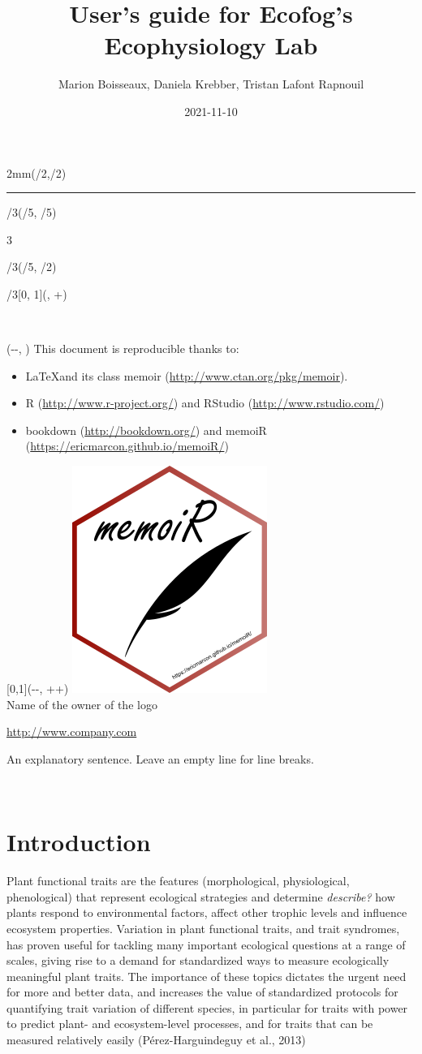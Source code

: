 \documentclass[
  12pt,
  american,
  a4paper,
  extrafontsizes,onecolumn,openright
  ]{memoir}
\title{User's guide for Ecofog's Ecophysiology Lab}
\author{Marion Boisseaux, Daniela Krebber, Tristan Lafont Rapnouil}
\date{2021-11-10}
\makeatletter
\newcommand{\MemoirChapStyle}{daleif1}
\newcommand{\MemoirPageStyle}{Ruled}
\newlength\widthw %
\newcommand*{\SmallMargins}{
  \setlrmarginsandblock{1.5in}{1.5in}{*}
  \setmarginnotes{0.1in}{0.1in}{0.1in}
 \setulmarginsandblock{1.5in}{1in}{*}
  \checkandfixthelayout
  \ch@ngetext
  \clearpage
  \setlength{\widthw}{\textwidth+\marginparsep+\marginparwidth}
  \footnotesatfoot
  \chapterstyle{\MemoirChapStyle}  %
  \pagestyle{\MemoirPageStyle}
}
\newcommand{\LargeMargins}{\SmallMargins}
\newcommand{\MainTitlePage}[2]{
  \SmallMargins %
  \pagestyle{empty} %
  \textblockorigin{\stockwidth-\paperwidth-\trimedge}{\trimtop} %
  \begin{textblock*}{2mm}(\spinemargin/2,\uppermargin/2)
    \rule{1pt}{\paperheight-\uppermargin}
  \end{textblock*}
  \begin{textblock*}{\paperwidth*2/3}(\paperwidth/5, \paperheight/5)
    \flushright
    \begin{Spacing}{3}
      {\fontfamily{qtm}\selectfont\fontsize{45}{45}\selectfont\textsc{\thetitle}}
    \end{Spacing}
  \end{textblock*}
    \begin{textblock*}{\paperwidth*2/3}(\paperwidth/5, \paperheight/2)
    \flushright
    {\fontfamily{qtm}\huge\theauthor}
  \end{textblock*}
    \begin{textblock*}{\paperwidth*2/3}[0, 1](\spinemargin, \uppermargin+\textheight)
    \normalfont\thedate
  \end{textblock*}
  ~\\ %
  \newpage
  \textblockorigin{\trimedge}{\trimtop} %
  \begin{textblock*}{\textwidth}(\paperwidth-\spinemargin-\textwidth, \uppermargin)
    #1
  \end{textblock*}
  \begin{textblock*}{\textwidth}[0,1](\paperwidth-\spinemargin-\textwidth, \uppermargin+\textheight+\footskip)
    \centering
    \includegraphics[width=\paperwidth/4]{logo}\\ \bigskip
    #2
  \end{textblock*}
  ~\\ %
  \newpage
}
\makeatother
\begin{document}
\frontmatter



\cleardoublepage

\MainTitlePage{This document is reproducible thanks to:

\begin{itemize}
  \item \LaTeX and its class memoir (\url{http://www.ctan.org/pkg/memoir}).
  \item R (\url{http://www.r-project.org/}) and RStudio (\url{http://www.rstudio.com/})
  \item bookdown (\url{http://bookdown.org/}) and memoiR (\url{https://ericmarcon.github.io/memoiR/})
\end{itemize}}{Name of the owner of the logo

\url{http://www.company.com}

An explanatory sentence.
Leave an empty line for line breaks.}







\LargeMargins
{
\hypersetup{linkcolor=}
\setcounter{tocdepth}{2}
\tableofcontents
}



\LargeMargins
\hypertarget{intro}{%
\chapter{Introduction}\label{intro}}

Plant functional traits are the features (morphological, physiological, phenological) that represent ecological strategies and determine \emph{describe?} how plants respond to environmental factors, affect other trophic levels and influence ecosystem properties.
Variation in plant functional traits, and trait syndromes, has proven useful for tackling many important ecological questions at a range of scales, giving rise to a demand for standardized ways to measure ecologically meaningful plant traits.
The importance of these topics dictates the urgent need for more and better data, and increases the value of standardized protocols for quantifying trait variation of different species, in particular for traits with power to predict plant- and ecosystem-level processes, and for traits that can be measured relatively easily (Pérez-Harguindeguy et al., 2013)
\end{document}
